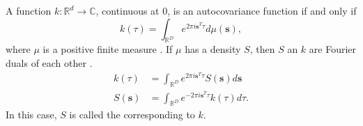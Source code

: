 \begin{Theorem}
	A function $k : \mathbb{R}^d \to \mathbb{C}$, continuous at $0$, is an autocovariance function if and only if 
	\begin{equation}
	k(\tau) = \int_{\mathbb{R}^D} e^{2 \pi i \mathbf{s}^T \tau} d \mu (\mathbf{s}),
	\end{equation}
	where $\mu$ is a positive finite measure \cite{Stein_1999,Rasmussen06}.
	If $\mu$ has a density $S$, then $S$ an $k$ are Fourier duals of each other \cite{Chatfield_2004}.
	\begin{displaymath}
	\begin{split}
	k(\tau) & = \int_{\mathbb{R}^D} e^{2 \pi i \mathbf{s}^T \tau} S(\mathbf{s}) d\mathbf{s} \\
	S(\mathbf{s}) & = \int_{\mathbb{R}^D} e^{-2 \pi i \mathbf{s}^T \tau} k(\tau) d \tau.
	\end{split}
	\end{displaymath}
	In this case, $S$ is called the  corresponding to $k$.
\end{Theorem}


